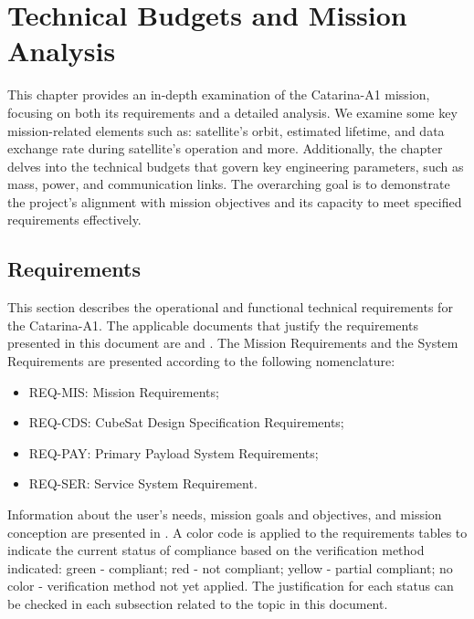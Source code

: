 %
%
%
%
%

%
%
%
%
%
%

\chapter{Technical Budgets and Mission Analysis} \label{ch:budgets}

This chapter provides an in-depth examination of the Catarina-A1 mission, focusing on both its requirements and a detailed analysis. We examine some key mission-related elements such as: satellite's orbit, estimated lifetime, and data exchange rate during satellite's operation and more. Additionally, the chapter delves into the technical budgets that govern key engineering parameters, such as mass, power, and communication links. The overarching goal is to demonstrate the project's alignment with mission objectives and its capacity to meet specified requirements effectively.

\section{Requirements}

This section describes the operational and functional technical requirements for the Catarina-A1. The applicable documents that justify the requirements presented in this document are \cite{mdd} and \cite{ma}. The Mission Requirements and the System Requirements are presented according to the following nomenclature:

\begin{itemize}
    \item REQ-MIS: Mission Requirements;
    \item REQ-CDS: CubeSat Design Specification Requirements;
    \item REQ-PAY: Primary Payload System Requirements;
    \item REQ-SER: Service System Requirement.
\end{itemize}

Information about the user’s needs, mission goals and objectives, and mission conception are presented in \cite{mdd}. A color code is applied to the requirements tables to indicate the current status of compliance based on the verification method indicated: green - compliant; red - not compliant; yellow - partial compliant; no color - verification method not yet applied. The justification for each status can be checked in each subsection related to the topic in this document.

